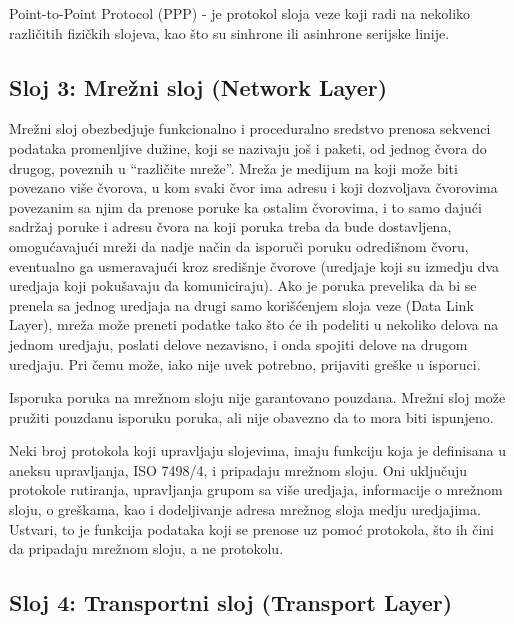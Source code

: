 \documentclass[a4paper,12pt, master]{etf}
\begin{document}
	Point-to-Point Protocol (PPP) - je protokol sloja veze koji radi na
	nekoliko razli\v{c}itih	fizi\v{c}kih slojeva, kao \v{s}to su sinhrone ili
	asinhrone serijske linije.

	\subsection{Sloj 3: Mre\v{z}ni sloj (Network Layer)}

	Mre\v{z}ni sloj obezbedjuje funkcionalno i proceduralno sredstvo prenosa
	sekvenci podataka promenljive du\v{z}ine, koji se nazivaju jo\v{s} i paketi,
	od jednog \v{c}vora do drugog, poveznih u ``razli\v{c}ite mre\v{z}e''.
	Mre\v{z}a je medijum na koji mo\v{z}e biti povezano vi\v{s}e \v{c}vorova, u
    kom svaki \v{c}vor ima adresu i koji dozvoljava \v{c}vorovima povezanim sa
    njim da prenose poruke ka ostalim \v{c}vorovima, i to samo daju\'{c}i
    sadr\v{z}aj poruke i adresu \v{c}vora na koji poruka treba da bude
    dostavljena, omogu\'{c}avaju\'{c}i mre\v{z}i da nadje na\v{c}in da isporu\v{c}i
    poruku odredi\v{s}nom \v{c}voru, eventualno ga usmeravaju\'{c}i kroz
    sredi\v{s}nje \v{c}vorove (uredjaje koji su izmedju dva uredjaja koji
    poku\v{s}avaju da komuniciraju). Ako je poruka prevelika da bi se prenela sa
    jednog uredjaja na drugi samo kori\v{s}\'{c}enjem sloja veze (Data Link
    Layer), mre\v{z}a mo\v{z}e preneti podatke tako \v{s}to \'{c}e ih podeliti
    u nekoliko delova na jednom uredjaju, poslati delove nezavisno, i onda
    spojiti delove na drugom uredjaju. Pri \v{c}emu mo\v{z}e, iako nije uvek
    potrebno, prijaviti gre\v{s}ke u isporuci.

	Isporuka poruka na mre\v{z}nom sloju nije garantovano pouzdana. Mre\v{z}ni
	sloj mo\v{z}e pru\v{z}iti pouzdanu isporuku poruka, ali nije obavezno da to
	mora biti ispunjeno.

	Neki broj protokola koji upravljaju slojevima, imaju funkciju koja je
	definisana u aneksu	upravljanja, ISO 7498/4, i pripadaju mre\v{z}nom sloju.
	Oni uklju\v{c}uju protokole rutiranja, upravljanja grupom sa vi\v{s}e
	uredjaja, informacije o mre\v{z}nom sloju, o gre\v{s}kama, kao i
	dodeljivanje adresa mre\v{z}nog sloja medju uredjajima. Ustvari, to je
	funkcija podataka koji se prenose uz pomo\'{c} protokola, \v{s}to ih
	\v{c}ini da pripadaju mre\v{z}nom sloju, a ne protokolu.

	\subsection{Sloj 4: Transportni sloj (Transport Layer)}
\end{document}
